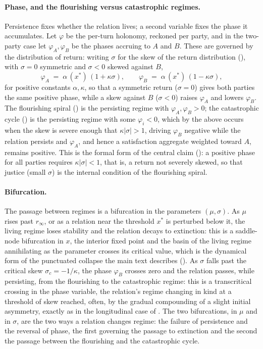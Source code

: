 \paragraph{Phase, and the flourishing versus catastrophic regimes.}
Persistence fixes whether the relation lives; a second variable fixes the phase it accumulates. Let $\varphi$ be the per-turn holonomy, reckoned per party, and in the two-party case let $\varphi_A, \varphi_B$ be the phases accruing to $A$ and $B$. These are governed by the distribution of return: writing $\sigma$ for the skew of the return distribution (), with $\sigma = 0$ symmetric and $\sigma < 0$ skewed against $B$,
\[
\varphi_A \;=\; \alpha\,(x^* )\,(1 + \kappa\sigma), \qquad \varphi_B \;=\; \alpha\,(x^*)\,(1 - \kappa\sigma),
\]
for positive constants $\alpha, \kappa$, so that a symmetric return ($\sigma = 0$) gives both parties the same positive phase, while a skew against $B$ ($\sigma < 0$) raises $\varphi_A$ and lowers $\varphi_B$. The flourishing spiral () is the persisting regime with $\varphi_A, \varphi_B > 0$; the catastrophic cycle () is the persisting regime with some $\varphi_i < 0$, which by the above occurs when the skew is severe enough that $\kappa|\sigma| > 1$, driving $\varphi_B$ negative while the relation persists and $\varphi_A$, and hence a satisfaction aggregate weighted toward $A$, remains positive. This is the formal form of the central claim (): a positive phase for all parties requires $\kappa|\sigma| < 1$, that is, a return not severely skewed, so that justice (small $\sigma$) is the internal condition of the flourishing spiral.

\paragraph{Bifurcation.}
The passage between regimes is a bifurcation in the parameters $(\mu, \sigma)$. As $\mu$ rises past $r_\infty$, or as a relation near the threshold $x^*$ is perturbed below it, the living regime loses stability and the relation decays to extinction: this is a saddle-node bifurcation in $x$, the interior fixed point and the basin of the living regime annihilating as the parameter crosses its critical value, which is the dynamical form of the punctuated collapse the main text describes (). As $\sigma$ falls past the critical skew $\sigma_c = -1/\kappa$, the phase $\varphi_B$ crosses zero and the relation passes, while persisting, from the flourishing to the catastrophic regime: this is a transcritical crossing in the phase variable, the relation's regime changing in kind at a threshold of skew reached, often, by the gradual compounding of a slight initial asymmetry, exactly as in the longitudinal case of . The two bifurcations, in $\mu$ and in $\sigma$, are the two ways a relation changes regime: the failure of persistence and the reversal of phase, the first governing the passage to extinction and the second the passage between the flourishing and the catastrophic cycle.

